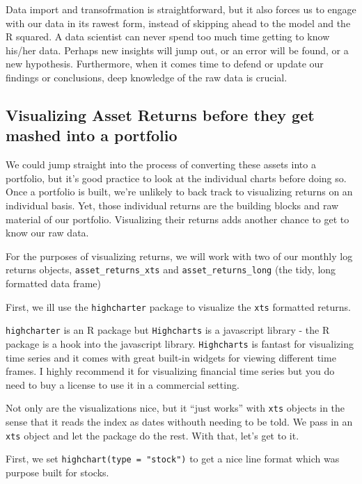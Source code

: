 \documentclass[]{krantz}
\begin{document}
Data import and transofrmation is straightforward, but it also forces us
to engage with our data in its rawest form, instead of skipping ahead to
the model and the R squared. A data scientist can never spend too much
time getting to know his/her data. Perhaps new insights will jump out,
or an error will be found, or a new hypothesis. Furthermore, when it
comes time to defend or update our findings or conclusions, deep
knowledge of the raw data is crucial.

\subsection*{Visualizing Asset Returns before they get mashed into a
portfolio}\label{visualizing-asset-returns-before-they-get-mashed-into-a-portfolio}

We could jump straight into the process of converting these assets into
a portfolio, but it's good practice to look at the individual charts
before doing so. Once a portfolio is built, we're unlikely to back track
to visualizing returns on an individual basis. Yet, those individual
returns are the building blocks and raw material of our portfolio.
Visualizing their returns adds another chance to get to know our raw
data.

For the purposes of visualizing returns, we will work with two of our
monthly log returns objects, \texttt{asset\_returns\_xts} and
\texttt{asset\_returns\_long} (the tidy, long formatted data frame)

First, we ill use the \texttt{highcharter} package to visualize the
\texttt{xts} formatted returns.

\texttt{highcharter} is an R package but \texttt{Highcharts} is a
javascript library - the R package is a hook into the javascript
library. \texttt{Highcharts} is fantast for visualizing time series and
it comes with great built-in widgets for viewing different time frames.
I highly recommend it for visualizing financial time series but you do
need to buy a license to use it in a commercial setting.

Not only are the visualizations nice, but it ``just works'' with
\texttt{xts} objects in the sense that it reads the index as dates
withouth needing to be told. We pass in an \texttt{xts} object and let
the package do the rest. With that, let's get to it.

First, we set \texttt{highchart(type\ =\ "stock")} to get a nice line
format which was purpose built for stocks.
\end{document}
